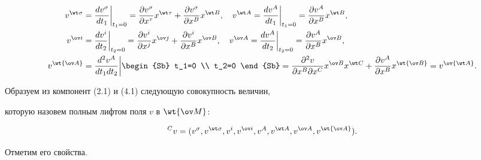 \begin{align}


v^{\wt\sigma}&=\frac{dv^\sigma}{dt_1}\biggl.\biggr|_{t_1=0}=


\frac{\partial v^\sigma}{\partial x^\tau}x^{\wt\tau}+


\frac{\partial v^\sigma}{\partial x^B}x^{\wt B},\quad


v^{\wt A}=\frac{dv^A}{dt_1}\biggl. \biggr|_{t_1=0}=


\frac{\partial v^A}{\partial x^B}x^{\wt B},\notag \\


%


v^{\ov i }&=\frac{dv^i}{dt_2}\biggl.\biggr|_{t_2=0}=


\frac{\partial v^i}{\partial x^j}x^{\ov j}+


\frac{\partial v^i}{\partial x^B}x^{\ov B},\quad


v^{\ov A}=\frac{dv^A}{dt_2}\biggl. \biggr|_{t_2=0}=


\frac{\partial v^A}{\partial x^B}x^{\ov B}, \\


%


v^{\wt{\ov A}}&=\frac{d^2 v^A}{dt_1 dt_2}


\biggl. \biggr|\begin{Sb} t_1=0 \\ t_2=0 \end{Sb}


=\frac{\partial^2 v}{\partial x^B\partial x^C}


x^{\ov B}x^{\wt C}+


\frac{\partial v^A}{\partial x^B}x^{\wt{\ov B}}=


v^{\ov{\wt A}}.\notag


\end{align}


Образуем из компонент (2.1) и (4.1) следующую совокупность величин,


которую назовем полным лифтом поля $v$ в $\wt{\ov M}$:


\begin{equation}


{}^C v=(v^\sigma,v^{\wt\sigma},v^i,v^{\ov i},v^A,


v^{\wt A},v^{\ov A},v^{\wt{\ov A}}).


\end{equation}


Отметим его свойства.





